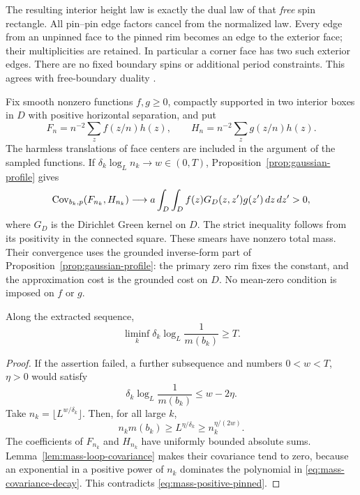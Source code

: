 The resulting interior height law is exactly the dual law of that
\emph{free} spin rectangle.  All pin--pin edge factors cancel from
the normalized law.  Every edge from an unpinned face to the pinned
rim becomes an edge to the exterior face; their multiplicities are
retained.  In particular a corner face has two such exterior edges.
There are no fixed boundary spins or additional period constraints.
This agrees with free-boundary duality
\cite[Lemma~2.1]{X}.

Fix smooth nonzero functions \(f,g\ge0\), compactly supported in two
interior boxes in \(D\) with positive horizontal separation, and
put
\[
 F_n=n^{-2}\sum_z f(z/n)h(z),\qquad
 H_n=n^{-2}\sum_z g(z/n)h(z).
\]
The harmless translations of face centers are included in the
argument of the sampled functions.  If
\(\delta_k\log_L n_k\to w\in(0,T)\),
Proposition~\ref{prop:gaussian-profile} gives
\begin{equation}\label{eq:mass-positive-pinned}
 \operatorname{Cov}_{b_k,p}(F_{n_k},H_{n_k})
 \longrightarrow a\int_D\int_Df(z)G_D(z,z')g(z')\,dz\,dz'>0,
\end{equation}
where \(G_D\) is the Dirichlet Green kernel on \(D\).
The strict inequality follows from its positivity in the connected
square.  These smears have nonzero total mass.  Their convergence
uses the grounded inverse-form part of
Proposition~\ref{prop:gaussian-profile}: the primary zero rim fixes
the constant, and the approximation cost is the grounded cost on
\(D\).  No mean-zero condition is imposed on \(f\) or \(g\).

\begin{proposition}\label{prop:mass-lower-length}
Along the extracted sequence,
\begin{equation}\label{eq:mass-liminf}
                 \liminf_k\delta_k\log_L\frac1{m(b_k)}\ge T.
\end{equation}
\end{proposition}

\begin{proof}
If the assertion failed, a further subsequence and numbers
\(0<w<T\), \(\eta>0\) would satisfy
\[
                  \delta_k\log_L\frac1{m(b_k)}\le w-2\eta.
\]
Take \(n_k=\lfloor L^{w/\delta_k}\rfloor\).  Then, for all large
\(k\),
\[
 n_km(b_k)\ge L^{\eta/\delta_k}
                    \ge n_k^{\eta/(2w)}.
\]
The coefficients of \(F_{n_k}\) and \(H_{n_k}\) have uniformly
bounded absolute sums.  Lemma~\ref{lem:mass-loop-covariance} makes
their covariance tend to zero, because an exponential in a positive
power of \(n_k\) dominates the polynomial in
\eqref{eq:mass-covariance-decay}.  This contradicts
\eqref{eq:mass-positive-pinned}.
\end{proof}

